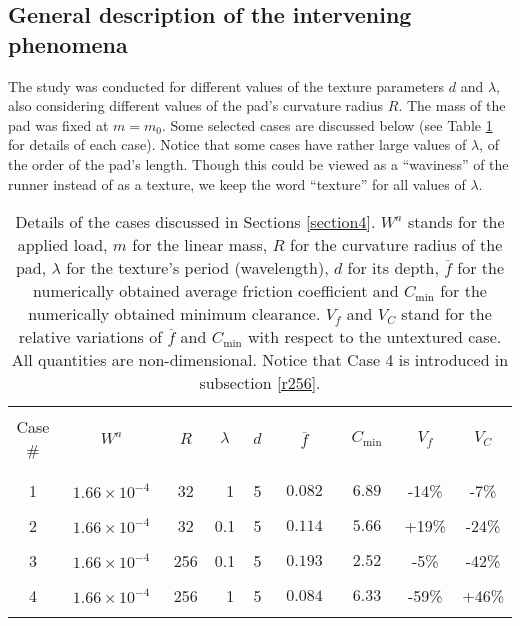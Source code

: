 \subsection{General description of the intervening phenomena}
\label{gendescrip}

The study was conducted for different values of the texture
parameters $d$ and $\lambda$, also considering different values of
the pad's curvature radius $R$. The mass of the pad was fixed
at $m=m_0$. Some selected
cases are discussed below (see Table \ref{tablecases} for details of
each case). Notice that some cases have rather large values of $\lambda$,
of the order of the pad's length. Though this could be viewed as
a ``waviness'' of the runner instead of as a texture, we keep the 
word ``texture'' for all values of $\lambda$.

\begin{table}
\begin{center}
\begin{tabular}{ccccccccc}
\hline
 & & & & & & & &\\
Case \# & $W^a$ & $R$ & $\lambda$ & $d$ & $\overline{f}$ & $C_{\min}$ & $V_f$ & $V_C$ \\
& & & & & & & & \\
\hline
& & & & & & & & \\
$~~~$1$~~~$ &  $~~1.66\times 10^{-4}~~$ &  $~~~$32$~~~$& $~~~$1$~~~$ & $~~~$5$~~~$ & $0.082$ & $6.89$ & -14\% & -7\%\\ %
& & & & & & & & \\
$~~~$2$~~~$ &  $~~1.66\times 10^{-4}~~$ & $~~~$32$~~~$& $~~~$0.1$~~~$ & $~~~$5$~~~$ & $0.114$ & $5.66$ & +19\% & -24\%\\
& & & & & & & & \\
$~~~$3$~~~$ &  $~~1.66\times 10^{-4}~~$ & $~~~$256$~~~$& $~~~$0.1$~~~$ & $~~~$5$~~~$ & $~~0.193~~$& $~~2.52~~$ & -5\% & -42\%\\
& & & & & & &  &\\
$~~~$4$~~~$ &  $~~1.66\times 10^{-4}~~$ & $~~~$256$~~~$& $~~~$1$~~~$ & $~~~$5$~~~$ & $~~0.084~~$& $~~6.33~~$ & -59\% & +46\%\\
& & & & & & & & \\
\hline
\end{tabular}
\end{center}
\caption{Details of the cases discussed in Sections \ref{section4}.
$W^a$ stands for the applied load, $m$ for the linear mass,
$R$ for the curvature radius of the pad, 
$\lambda$ for the texture's period (wavelength),
$d$ for its depth, $\overline{f}$ for the numerically obtained average
friction coefficient and $C_{\min}$ for the numerically obtained minimum
clearance. $V_f$ and $V_C$ stand for the relative variations of $\overline{f}$
and $C_{\min}$ with respect to the untextured case.
All quantities are non-dimensional. Notice that Case 4 is
introduced in subsection \ref{r256}.
}
\label{tablecases}
\end{table}


